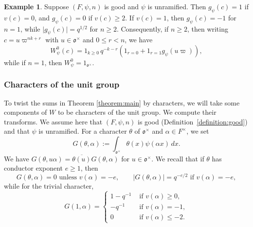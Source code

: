 \documentclass[reqno]{amsart}
\theoremstyle{plain}
\theoremstyle{definition}
\newtheorem{example}[theorem]{Example}
\theoremstyle{itplain}
\numberwithin{equation}{section}
\numberwithin{theorem}{section}
\begin{document}
\begin{example}\label{example:unramified-basic-function}
  Suppose $(F, \psi, n)$ is good and $\psi$ is unramified.  Then $g_\psi(c) = 1$ if $v(c) = 0$, and $g_\psi(c) = 0$ if $v(c) \geq 2$.  If $v(c) = 1$, then $g_\psi(c) = -1$ for $n = 1$, while $\lvert g_\psi(c) \rvert = q^{1/2}$ for $n \geq 2$.  Consequently, if $n \geq 2$, then writing $c = u \varpi^{n k + r}$ with $u \in \mathfrak{o}^\times$ and $0 \leq r < n$, we have
  \begin{equation*}
    W_\psi^0(c)
    = 1_{k \geq 0} \, q^{- k - r} \left( 1_{r = 0} + 1_{r = 1} g_\psi(u \varpi) \right),
  \end{equation*}
  while if $n = 1$, then $W_\psi^0 = 1_{\mathfrak{o}^\times}$.
\end{example}

\subsubsection{Characters of the unit group}\label{sec:twisted-vectors}
To twist the sums in Theorem \ref{theorem:main} by characters, we will take some components of $W$ to be characters of the unit group.  We compute their transforms.  We assume here that $(F, \psi, n)$ is good (Definition~\ref{definition:good}) and that $\psi$ is unramified.  For a character $\theta$ of $\mathfrak{o}^\times$ and $\alpha \in F^\times$, we set
\begin{equation*}
  G(\theta, \alpha) := \int_{\mathfrak{o}^\times} \theta(x) \psi(\alpha x) \, d x.
\end{equation*}
We have $G(\theta, u \alpha) = \overline{\theta(u)} G(\theta, \alpha)$ for $u \in \mathfrak{o}^\times$.  We recall that if $\theta$ has conductor exponent $e \geq 1$, then
\begin{equation}\label{eq:gauss-sum-facts}
  G(\theta, \alpha) = 0 \text{ unless } v(\alpha) = -e,
  \qquad 
  \lvert G(\theta, \alpha) \rvert = q^{-e/2} \text{ if } v(\alpha) = -e,
\end{equation}
while for the trivial character,
\begin{equation}\label{eq:ramanujan-facts}
  G(1, \alpha) =
  \begin{cases}
    1 - q^{-1} & \text{ if } v(\alpha) \geq 0, \\
    - q^{-1} & \text{ if } v(\alpha) = -1, \\
    0 & \text{ if } v(\alpha) \leq -2.
  \end{cases}
\end{equation}
\end{document}
